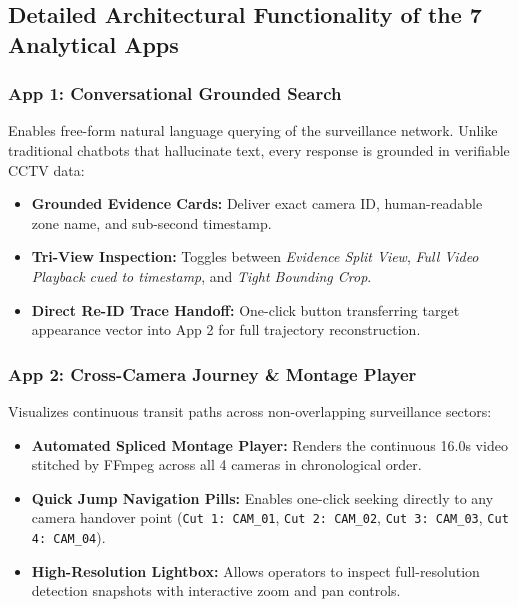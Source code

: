 \documentclass[12pt,a4paper]{article}
\begin{document}
\subsection{Detailed Architectural Functionality of the 7 Analytical Apps}

\subsubsection{App 1: Conversational Grounded Search}
Enables free-form natural language querying of the surveillance network. Unlike traditional chatbots that hallucinate text, every response is grounded in verifiable CCTV data:
\begin{itemize}
    \item \textbf{Grounded Evidence Cards:} Deliver exact camera ID, human-readable zone name, and sub-second timestamp.
    \item \textbf{Tri-View Inspection:} Toggles between \textit{Evidence Split View}, \textit{Full Video Playback cued to timestamp}, and \textit{Tight Bounding Crop}.
    \item \textbf{Direct Re-ID Trace Handoff:} One-click button transferring target appearance vector into App 2 for full trajectory reconstruction.
\end{itemize}

\subsubsection{App 2: Cross-Camera Journey \& Montage Player}
Visualizes continuous transit paths across non-overlapping surveillance sectors:
\begin{itemize}
    \item \textbf{Automated Spliced Montage Player:} Renders the continuous 16.0s video stitched by FFmpeg across all 4 cameras in chronological order.
    \item \textbf{Quick Jump Navigation Pills:} Enables one-click seeking directly to any camera handover point (\texttt{Cut 1: CAM\_01}, \texttt{Cut 2: CAM\_02}, \texttt{Cut 3: CAM\_03}, \texttt{Cut 4: CAM\_04}).
    \item \textbf{High-Resolution Lightbox:} Allows operators to inspect full-resolution detection snapshots with interactive zoom and pan controls.
\end{itemize}
\end{document}
